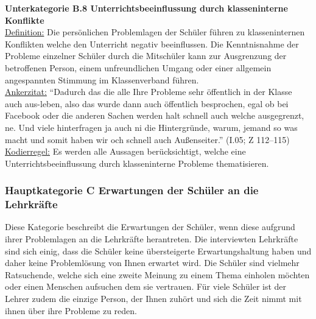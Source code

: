\textbf{Unterkategorie B.8 Unterrichtsbeeinflussung durch klasseninterne Konflikte}\\
\underline{Definition:} Die persönlichen Problemlagen der Schüler führen zu klasseninternen Konflikten welche den Unterricht negativ beeinflussen. Die Kenntnisnahme der Probleme einzelner Schüler durch die Mitschüler kann zur Ausgrenzung der betroffenen Person, einem unfreundlichen Umgang oder einer allgemein angespannten Stimmung im Klassenverband führen.\\
\underline{Ankerzitat:} "`Dadurch das die alle Ihre Probleme sehr öffentlich in der Klasse auch aus-leben, also das wurde dann auch öffentlich besprochen, egal ob bei Facebook oder die anderen Sachen werden halt schnell auch welche ausgegrenzt, ne. Und viele hinterfragen ja auch ni die Hintergründe, warum, jemand so was macht und somit haben wir och schnell auch Außenseiter."' (I.05; Z 112--115)\\
\underline{Kodierregel:} Es werden alle Aussagen berücksichtigt, welche eine Unterrichtsbeeinflussung durch klasseninterne Probleme thematisieren.\\

\subsubsection{Hauptkategorie C Erwartungen der Schüler an die Lehrkräfte}
\label{sec:HauptkategorieCErwartungenDerSchülerAnDieLehrkräfte}

Diese Kategorie beschreibt die Erwartungen der Schüler, wenn diese aufgrund ihrer Problemlagen an die Lehrkräfte herantreten. Die interviewten Lehrkräfte sind sich einig, dass die Schüler keine übersteigerte Erwartungshaltung haben und daher keine Problemlösung von Ihnen erwartet wird. Die Schüler sind vielmehr Ratsuchende, welche sich eine zweite Meinung zu einem Thema einholen möchten oder einen Menschen aufsuchen dem sie vertrauen. Für viele Schüler ist der Lehrer zudem die einzige Person, der Ihnen zuhört und sich die Zeit nimmt mit ihnen über ihre Probleme zu reden.\\

